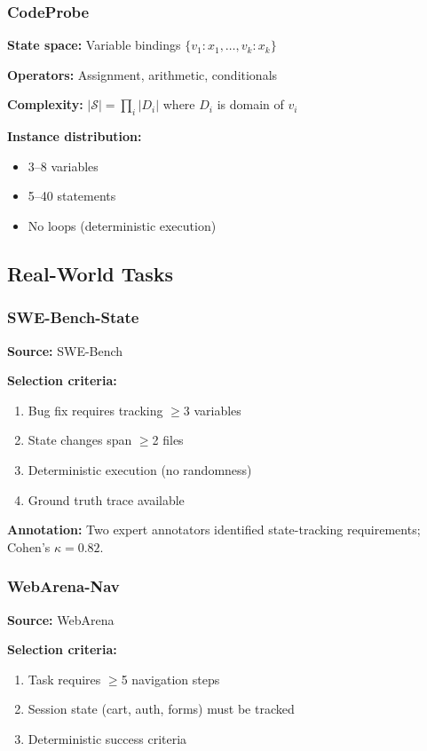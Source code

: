 \documentclass{article}
\theoremstyle{plain}
\theoremstyle{definition}
\theoremstyle{remark}
\begin{document}
\subsubsection{CodeProbe}

\textbf{State space:} Variable bindings $\{v_1: x_1, \ldots, v_k: x_k\}$

\textbf{Operators:} Assignment, arithmetic, conditionals

\textbf{Complexity:} $|\mathcal{S}| = \prod_i |D_i|$ where $D_i$ is domain of $v_i$

\textbf{Instance distribution:}
\begin{itemize}
\item 3--8 variables
\item 5--40 statements
\item No loops (deterministic execution)
\end{itemize}

\subsection{Real-World Tasks}

\subsubsection{SWE-Bench-State}

\textbf{Source:} SWE-Bench \citep{jimenez2024swebench}

\textbf{Selection criteria:}
\begin{enumerate}
\item Bug fix requires tracking $\geq$3 variables
\item State changes span $\geq$2 files
\item Deterministic execution (no randomness)
\item Ground truth trace available
\end{enumerate}

\textbf{Annotation:} Two expert annotators identified state-tracking requirements; Cohen's $\kappa = 0.82$.

\subsubsection{WebArena-Nav}

\textbf{Source:} WebArena \citep{zhou2024webarena}

\textbf{Selection criteria:}
\begin{enumerate}
\item Task requires $\geq$5 navigation steps
\item Session state (cart, auth, forms) must be tracked
\item Deterministic success criteria
\end{enumerate}
\end{document}
